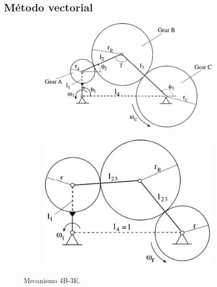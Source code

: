 \documentclass[12pt, final]{extarticle}
\begin{document}
\subsection{Método vectorial}
\begin{figure}[ht]
    \centering
    \begin{subfigure}[b]{0.45\textwidth}
        \centering
        \includegraphics[width=\textwidth]{Media/mecanismo4b-3e.png}
        \caption{}
        \label{Fig: Mecanismo 4B-3E a}
    \end{subfigure}
    \hfill
    \begin{subfigure}[b]{0.45\textwidth}
        \centering
        \includegraphics[width=\textwidth]{Media/4B-3E.png}
        \caption{}
        \label{Fig: Mecanismo 4B-3E b}
    \end{subfigure}
    \label{Fig: Mecanismo 4B-3E}
    \caption{Mecanismo 4B-3E.}
\end{figure}
\end{document}
